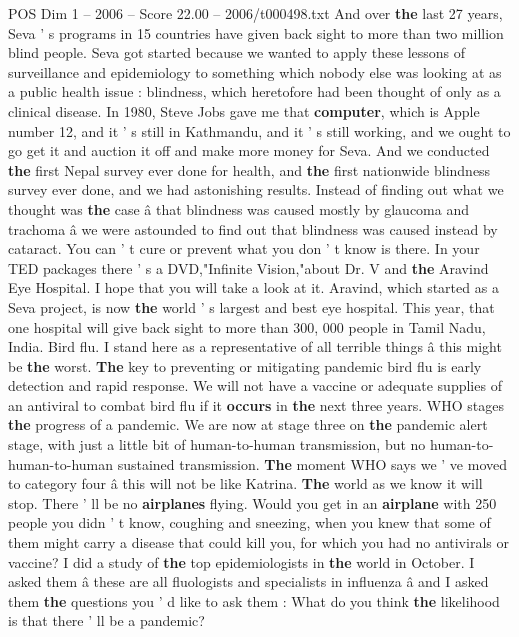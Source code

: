 \begin{textsample}{POS Dim 1 – 2006 – Score 22.00 – 2006/t000498.txt}
And over \textbf{the} last 27 years, Seva ' s programs in 15 countries have given back sight to more than two million blind people.
Seva got started because we wanted to apply these lessons of surveillance and epidemiology to something which nobody else was looking at as a public health issue : blindness, which heretofore had been thought of only as a clinical disease.
In 1980, Steve Jobs gave me that \textbf{computer}, which is Apple number 12, and it ' s still in Kathmandu, and it ' s still working, and we ought to go get it and auction it off and make more money for Seva.
And we conducted \textbf{the} first Nepal survey ever done for health, and \textbf{the} first nationwide blindness survey ever done, and we had astonishing results.
Instead of finding out what we thought was \textbf{the} case â that blindness was caused mostly by glaucoma and trachoma â we were astounded to find out that blindness was caused instead by cataract.
You can ' t cure or prevent what you don ' t know is there.
In your TED packages there ' s a DVD,"Infinite Vision,"about Dr.
V and \textbf{the} Aravind Eye Hospital.
I hope that you will take a look at it.
Aravind, which started as a Seva project, is now \textbf{the} world ' s largest and best eye hospital.
This year, that one hospital will give back sight to more than 300, 000 people in Tamil Nadu, India.
Bird flu.
I stand here as a representative of all terrible things â this might be \textbf{the} worst. \textbf{The} key to preventing or mitigating pandemic bird flu is early detection and rapid response.
We will not have a vaccine or adequate supplies of an antiviral to combat bird flu if it \textbf{occurs} in \textbf{the} next three years.
WHO stages \textbf{the} progress of a pandemic.
We are now at stage three on \textbf{the} pandemic alert stage, with just a little bit of human-to-human transmission, but no human-to-human-to-human sustained transmission. \textbf{The} moment WHO says we ' ve moved to category four â this will not be like Katrina. \textbf{The} world as we know it will stop.
There ' ll be no \textbf{airplanes} flying.
Would you get in an \textbf{airplane} with 250 people you didn ' t know, coughing and sneezing, when you knew that some of them might carry a disease that could kill you, for which you had no antivirals or vaccine?
I did a study of \textbf{the} top epidemiologists in \textbf{the} world in October.
I asked them â these are all fluologists and specialists in influenza â and I asked them \textbf{the} questions you ' d like to ask them : What do you think \textbf{the} likelihood is that there ' ll be a pandemic?

\end{textsample}
